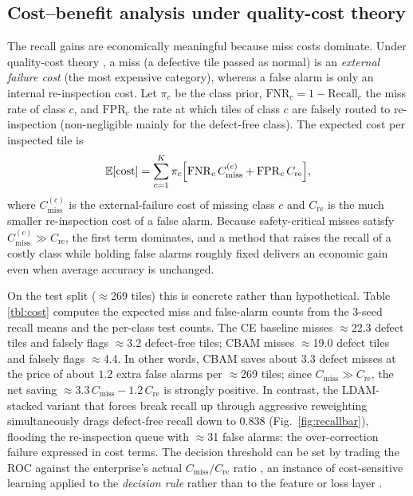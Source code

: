 \documentclass[a4paper,fleqn]{cas-sc}
\begin{document}
\begin{sloppypar}
	\subsection{Cost--benefit analysis under quality-cost theory}
	\par{
		The recall gains are economically meaningful because miss costs dominate. Under quality-cost theory \citep{juran1993quality}, a miss (a defective tile passed as normal) is an \emph{external failure cost} (the most expensive category), whereas a false alarm is only an internal re-inspection cost. Let $\pi_c$ be the class prior, $\mathrm{FNR}_c=1-\mathrm{Recall}_c$ the miss rate of class $c$, and $\mathrm{FPR}_c$ the rate at which tiles of class $c$ are falsely routed to re-inspection (non-negligible mainly for the defect-free class). The expected cost per inspected tile is
		\begin{equation}
			\mathbb{E}[\mathrm{cost}]=\sum_{c=1}^{K}\pi_c\Bigl[\mathrm{FNR}_c\,C_{\mathrm{miss}}^{(c)}+\mathrm{FPR}_c\,C_{\mathrm{re}}\Bigr],
			\label{eq:cost}
		\end{equation}
		where $C_{\mathrm{miss}}^{(c)}$ is the external-failure cost of missing class $c$ and $C_{\mathrm{re}}$ is the much smaller re-inspection cost of a false alarm. Because safety-critical misses satisfy $C_{\mathrm{miss}}^{(c)}\gg C_{\mathrm{re}}$, the first term dominates, and a method that raises the recall of a costly class while holding false alarms roughly fixed delivers an economic gain even when average accuracy is unchanged.
	}

	\par{
		On the test split ($\approx$269 tiles) this is concrete rather than hypothetical. Table \ref{tbl:cost} computes the expected miss and false-alarm counts from the 3-seed recall means and the per-class test counts. The CE baseline misses $\approx$22.3 defect tiles and falsely flags $\approx$3.2 defect-free tiles; CBAM misses $\approx$19.0 defect tiles and falsely flags $\approx$4.4. In other words, CBAM saves about $3.3$ defect misses at the price of about $1.2$ extra false alarms per $\approx$269 tiles; since $C_{\mathrm{miss}}\gg C_{\mathrm{re}}$, the net saving $\approx 3.3\,C_{\mathrm{miss}}-1.2\,C_{\mathrm{re}}$ is strongly positive. In contrast, the LDAM-stacked variant that forces break recall up through aggressive reweighting simultaneously drags defect-free recall down to 0.838 (Fig.~\ref{fig:recallbar}), flooding the re-inspection queue with $\approx$31 false alarms: the over-correction failure expressed in cost terms. The decision threshold can be set by trading the ROC against the enterprise's actual $C_{\mathrm{miss}}/C_{\mathrm{re}}$ ratio \citep{provost1997cost,elkan2001cost}, an instance of cost-sensitive learning applied to the \emph{decision rule} rather than to the feature or loss layer \citep{elkan2001cost,he2009learning}.
	}


\end{sloppypar}
\end{document}
